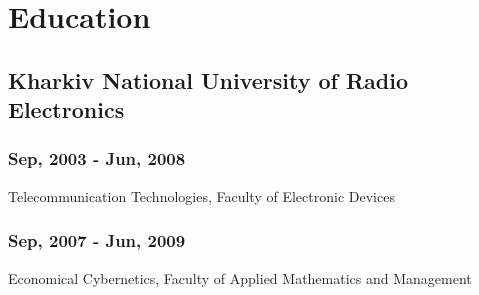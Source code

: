 \documentclass[letterpaper]{article}
\begin{document}
\section{Education}
\label{sec-4}
\subsection{Kharkiv National University of Radio Electronics}
\label{sec-4-1}
\subsubsection{Sep, 2003 - Jun, 2008}
\label{sec-4-1-1}
Telecommunication Technologies, Faculty of Electronic Devices
\subsubsection{Sep, 2007 - Jun, 2009}
\label{sec-4-1-2}
Economical Cybernetics, Faculty of Applied Mathematics and Management
\end{document}
